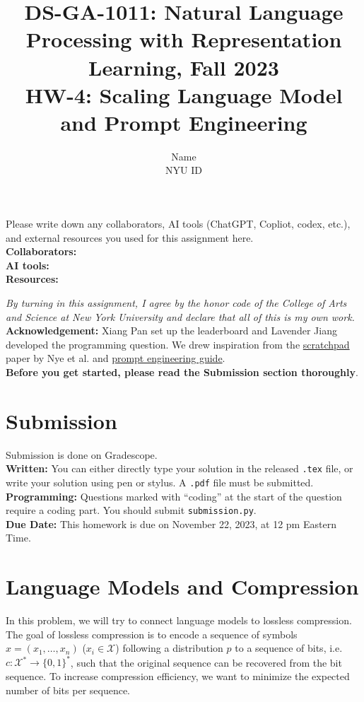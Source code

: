 \documentclass{article}
\title{\textbf{DS-GA-1011: Natural Language Processing with Representation Learning, Fall 2023} \\HW-4: Scaling Language Model and Prompt Engineering}
\author{Name \\
NYU ID}
\date{}
\theoremstyle{case}
\theoremstyle{definition}
\begin{document}
\maketitle

\begin{tcolorbox}
Please write down any collaborators, AI tools (ChatGPT, Copliot, codex, etc.), and external resources you used for this assignment here. \\
\textbf{Collaborators:} \\
\textbf{AI tools:} \\
\textbf{Resources:}
\end{tcolorbox}
\textit{By turning in this assignment, I agree by the honor code of the College of Arts and Science at New York University and declare
that all of this is my own work.} \\

\textbf{Acknowledgement:} Xiang Pan set up the leaderboard and Lavender Jiang developed the programming question. We drew inspiration from the \href{https://arxiv.org/abs/2112.00114}{scratchpad} paper by Nye et al. and \href{https://www.promptingguide.ai/}{prompt engineering guide}. \\


\textbf{Before you get started, please read the Submission section thoroughly}.

\section*{Submission}
Submission is done on Gradescope. \\

\textbf{Written:} You can either directly type your solution in the released \texttt{.tex} file,
or write your solution using pen or stylus.
A \texttt{.pdf} file must be submitted.\\

\textbf{Programming:} Questions marked with ``coding'' at the start of the question require a coding part. You should submit \texttt{submission.py}.\\

\textbf{Due Date:} This homework is due on November 22, 2023, at 12 pm Eastern Time.

\section{Language Models and Compression}

In this problem, we will try to connect language models to lossless compression.
The goal of lossless compression is to encode a sequence of symbols $x=(x_1,\ldots, x_n)$ ($x_i\in\mathcal{X}$) following a distribution $p$ to a sequence of bits, i.e.\ $c: \mathcal{X}^* \to \{0,1\}^*$,
such that the original sequence can be recovered from the bit sequence.
To increase compression efficiency, we want to minimize the expected number of bits per sequence.
\end{document}
